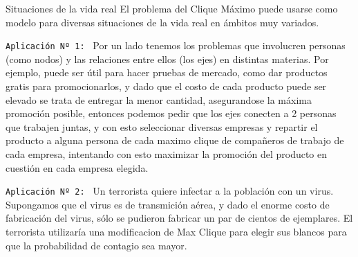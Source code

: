 \documentclass[12pt,titlepage]{article}
\newcommand{\Pa}{\vspace{5mm}}
\begin{document}
	\begin{section}{Situaciones de la vida real}
		El problema del Clique Máximo puede usarse como modelo para diversas situaciones de la vida real en ámbitos muy variados.\Pa
		
		\texttt{Aplicación Nº 1: }
			Por un lado tenemos los problemas que involucren personas (como nodos) y las relaciones entre ellos (los ejes) en distintas materias. Por ejemplo, puede ser útil para hacer pruebas de mercado, como dar productos gratis para promocionarlos, y dado que el costo de cada producto puede ser elevado se trata de entregar la menor cantidad, asegurandose la máxima promoción posible, entonces podemos pedir que los ejes conecten a 2 personas que trabajen juntas, y con esto seleccionar diversas empresas y repartir el producto a alguna persona de cada maximo clique de compañeros de trabajo de cada empresa, intentando con esto maximizar la promoción del producto en cuestión en cada empresa elegida.\Pa %


			
		\texttt{Aplicación Nº 2: }
			Un terrorista quiere infectar a la población con un virus. Supongamos que el virus es de transmición aérea, y dado el enorme costo de fabricación del virus, sólo se pudieron fabricar un par de cientos de ejemplares. El terrorista utilizaría una modificacion de Max Clique para elegir sus blancos para que la probabilidad de contagio sea mayor. 
	\newpage
	\end{section}
	
\end{document}
